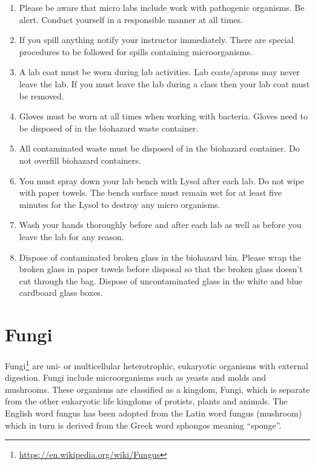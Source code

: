 \documentclass[]{book}
\providecommand{\tightlist}{%
  \setlength{\itemsep}{0pt}\setlength{\parskip}{0pt}}
\let\rmarkdownfootnote\footnote%
\def\footnote{\protect\rmarkdownfootnote}
\renewcommand{\href}[2]{#2\footnote{\url{#1}}}
\begin{document}
\begin{enumerate}
\def\labelenumi{\arabic{enumi}.}
\setcounter{enumi}{37}
\tightlist
\item
  Please be aware that micro labs include work with pathogenic organisms. Be alert. Conduct yourself in a responsible manner at all times.
\item
  If you spill anything notify your instructor immediately. There are special procedures to be followed for spills containing microorganisms.
\item
  A lab coat must be worn during lab activities. Lab coats/aprons may never leave the lab. If you must leave the lab during a class then your lab coat must be removed.
\item
  Gloves must be worn at all times when working with bacteria. Gloves need to be disposed of in the biohazard waste container.
\item
  All contaminated waste must be disposed of in the biohazard container. Do not overfill biohazard containers.
\item
  You must spray down your lab bench with Lysol after each lab. Do not wipe with paper towels. The bench surface must remain wet for at least five minutes for the Lysol to destroy any micro organisms.
\item
  Wash your hands thoroughly before and after each lab as well as before you leave the lab for any reason.
\item
  Dispose of contaminated broken glass in the biohazard bin. Please wrap the broken glass in paper towels before disposal so that the broken glass doesn't cut through the bag. Dispose of uncontaminated glass in the white and blue cardboard glass boxes.
\end{enumerate}

\hypertarget{fungi}{%
\chapter{Fungi}\label{fungi}}

\href{https://en.wikipedia.org/wiki/Fungus}{Fungi} are uni- or multicellular heterotrophic, eukaryotic organisms with external digestion. Fungi include microorganisms such as yeasts and molds and mushrooms. These organisms are classified as a kingdom, Fungi, which is separate from the other eukaryotic life kingdoms of protists, plants and animals. The English word fungus has been adopted from the Latin word fungus (mushroom) which in turn is derived from the Greek word sphongos meaning ``sponge''.
\end{document}
